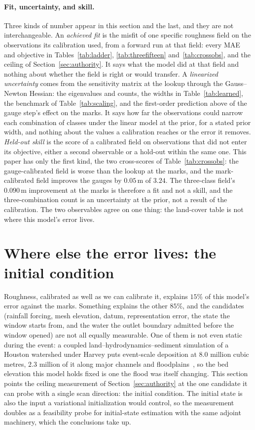 \documentclass[11pt]{article}
\begin{document}
\paragraph{Fit, uncertainty, and skill.}
Three kinds of number appear in this section and the last, and they
are not interchangeable. An \emph{achieved fit} is the misfit of one
specific roughness field on the observations its calibration used,
from a forward run at that field: every MAE and objective in
Tables~\ref{tab:ladder}, \ref{tab:threefifteen}
and~\ref{tab:crossobs}, and the ceiling of
Section~\ref{sec:authority}. It says what the model did at that field
and nothing about whether the field is right or would transfer. A
\emph{linearized uncertainty} comes from the sensitivity matrix at
the lookup through the Gauss--Newton Hessian: the eigenvalues and
counts, the widths in Table~\ref{tab:learned}, the benchmark of
Table~\ref{tab:scaling}, and the first-order prediction above of the
gauge step's effect on the marks. It says how far the observations
could narrow each combination of classes under the linear model at
the prior, for a stated prior width, and nothing about the values a
calibration reaches or the error it removes. \emph{Held-out skill} is
the score of a calibrated field on observations that did not enter
its objective, either a second observable or a hold-out within the
same one. This paper has only the first kind, the two cross-scores of
Table~\ref{tab:crossobs}: the gauge-calibrated field is worse than
the lookup at the marks, and the mark-calibrated field improves the
gauges by $0.05$\,m of $3.24$. The three-class field's $0.090$\,m
improvement at the marks is therefore a fit and not a skill, and the
three-combination count is an uncertainty at the prior, not a result
of the calibration. The two observables agree on one thing: the
land-cover table is not where this model's error lives.

\section{Where else the error lives: the initial condition}
\label{sec:icauthority}

Roughness, calibrated as well as we can calibrate it, explains $15\%$
of this model's error against the marks. Something explains the other
$85\%$, and the candidates (rainfall forcing, mesh elevation, datum,
representation error, the state the window starts from, and the water
the outlet boundary admitted before the window opened) are not all
equally measurable. One of them is not even static during the event: a
coupled land--hydrodynamics--sediment simulation of a Houston
watershed under Harvey puts event-scale deposition at $8.0$ million
cubic metres, $2.3$ million of it along major channels and
floodplains~\cite{feng2026sediment}, so the bed elevation this model
holds fixed is one the flood was itself changing. This section points
the ceiling
measurement of Section~\ref{sec:authority} at the one candidate it can
probe with a single scan direction: the initial condition. The
initial state is also the input a variational initialization would
control, so the measurement doubles as a feasibility probe for
initial-state estimation with the same adjoint machinery, which the
conclusions take up.
\end{document}
